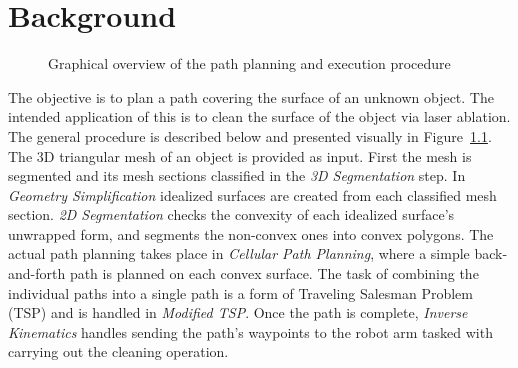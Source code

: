 \chapter{Background}

\begin{figure}[hb]
	\centering
{}
	\caption{Graphical overview of the path planning and execution procedure}
	\label{fig:bkgd_overview}
\end{figure}
The objective is to plan a path covering the surface of an unknown object.
The intended application of this is to clean the surface of the object via laser ablation.
The general procedure is described below and presented visually in Figure~\ref{fig:bkgd_overview}.
The 3D triangular mesh of an object is provided as input.
First the mesh is segmented and its mesh sections classified in the \textit{3D Segmentation} step.
In \textit{Geometry Simplification} idealized surfaces are created from each classified mesh section.
\textit{2D Segmentation} checks the convexity of each idealized surface's unwrapped form, and segments the non-convex ones into convex polygons.
The actual path planning takes place in \textit{Cellular Path Planning}, where a simple back-and-forth path is planned on each convex surface.
The task of combining the individual paths into a single path is a form of Traveling Salesman Problem (TSP) and is handled in \textit{Modified TSP}.
Once the path is complete, \textit{Inverse Kinematics} handles sending the path's waypoints to the robot arm tasked with carrying out the cleaning operation.

